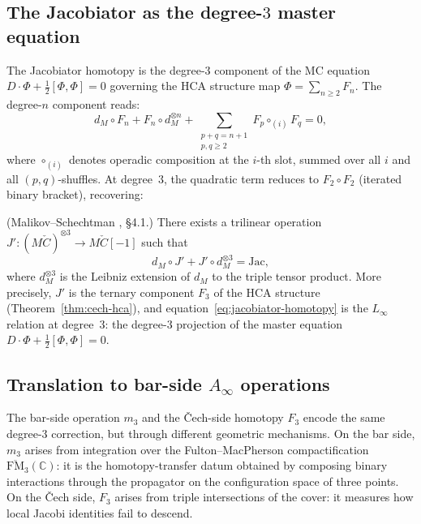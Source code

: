 \subsection{The Jacobiator as the degree-$3$ master equation}
\label{subsec:jacobiator-master}

The Jacobiator homotopy is the degree-$3$ component of the MC equation
$D \cdot \Phi + \tfrac{1}{2}[\Phi,\Phi] = 0$
governing the HCA structure map
$\Phi = \sum_{n \geq 2} F_n$. The degree-$n$ component reads:
\[
d_M \circ F_n
+ F_n \circ d_M^{\otimes n}
+ \sum_{\substack{p+q=n+1 \\ p,q \geq 2}}
 F_p \circ_{(i)} F_q
= 0,
\]
where $\circ_{(i)}$ denotes operadic composition at the $i$-th
slot, summed over all $i$ and all $(p,q)$-shuffles. At
degree~$3$, the quadratic term reduces to $F_2 \circ F_2$
(iterated binary bracket), recovering:

\begin{proposition}
\label{prop:jacobiator-nullhomotopic}
\textup{(Malikov--Schechtman \cite{MS24}, \S4.1.)}
There exists a trilinear operation
$J'\colon (M\check{C})^{\otimes 3} \to M\check{C}[-1]$ such that
\begin{equation}\label{eq:jacobiator-homotopy}
d_M \circ J' + J' \circ d_M^{\otimes 3} = \mathrm{Jac},
\end{equation}
where $d_M^{\otimes 3}$ is the Leibniz extension of $d_M$ to the
triple tensor product. More precisely, $J'$ is the ternary component
$F_3$ of the HCA structure
(Theorem~\textup{\ref{thm:cech-hca}}), and
equation~\eqref{eq:jacobiator-homotopy} is the $L_\infty$
relation at degree~$3$: the degree-$3$ projection of the master
equation $D \cdot \Phi + \tfrac{1}{2}[\Phi,\Phi] = 0$.
\end{proposition}

\subsection{Translation to bar-side $A_\infty$ operations}
\label{subsec:jacobiator-bar}

The bar-side operation $m_3$ and the \v{C}ech-side homotopy
$F_3$ encode the same degree-$3$ correction, but through different
geometric mechanisms. On the bar side, $m_3$ arises from
integration over the Fulton--MacPherson compactification
$\overline{\mathrm{FM}}_3(\mathbb{C})$: it is the homotopy-transfer
datum obtained by composing binary interactions through the
propagator on the configuration space of three points. On the
\v{C}ech side, $F_3$ arises from triple intersections of the cover:
it measures how local Jacobi identities fail to descend.

